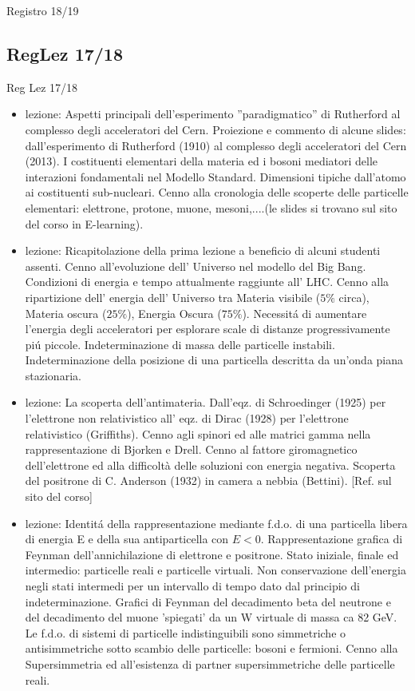 \begin{frame}{Registro 18/19}
\subsection{RegLez 17/18}
\begin{frame}[allowframebreaks]{Reg Lez 17/18}
\begin{itemize}
  
\item lezione: Aspetti principali dell'esperimento ''paradigmatico'' di Rutherford al complesso degli acceleratori del Cern. Proiezione e commento di alcune slides: dall'esperimento di Rutherford (1910) al complesso degli acceleratori del Cern (2013). I costituenti elementari della materia ed i bosoni mediatori delle interazioni fondamentali nel Modello Standard. Dimensioni tipiche dall'atomo ai costituenti sub-nucleari. Cenno alla cronologia delle scoperte delle particelle elementari: elettrone, protone, muone, mesoni,....(le slides si trovano sul sito del corso in E-learning). 

\item lezione: Ricapitolazione della prima lezione a beneficio di alcuni studenti assenti. Cenno all'evoluzione dell' Universo nel modello del Big Bang. Condizioni di energia e tempo attualmente raggiunte all' LHC. Cenno alla ripartizione dell' energia dell' Universo tra Materia visibile ($5\%$ circa), Materia oscura ($25\%$), Energia Oscura ($75\%$). Necessit\'a di aumentare l'energia degli acceleratori per esplorare scale di distanze progressivamente pi\'u piccole. Indeterminazione di massa delle particelle instabili. Indeterminazione della posizione di una particella descritta da un'onda piana stazionaria.

\item lezione: La scoperta dell'antimateria. Dall'eqz. di Schroedinger (1925) per l'elettrone non relativistico all' eqz. di Dirac (1928) per l'elettrone relativistico (Griffiths). Cenno agli spinori ed alle matrici gamma nella rappresentazione di Bjorken e Drell. Cenno al fattore giromagnetico dell'elettrone ed alla difficoltà delle soluzioni con energia negativa. Scoperta del positrone di C. Anderson (1932) in camera a nebbia (Bettini). [Ref. sul sito del corso]

\item lezione: Identit\'a della rappresentazione mediante f.d.o. di una particella libera di energia E e della sua antiparticella con $E<0$. Rappresentazione grafica di Feynman dell'annichilazione di elettrone e positrone. Stato iniziale, finale ed intermedio: particelle reali e particelle virtuali. Non conservazione dell'energia negli stati intermedi per un intervallo di tempo dato dal principio di indeterminazione. Grafici di Feynman del decadimento beta del neutrone e del decadimento del muone 'spiegati' da un W virtuale di massa ca 82 GeV. Le f.d.o. di sistemi di particelle indistinguibili sono simmetriche o antisimmetriche sotto scambio delle particelle: bosoni e fermioni. Cenno alla Supersimmetria ed all'esistenza di partner supersimmetriche delle particelle reali.


\end{itemize}
\end{frame}
\end{frame}
